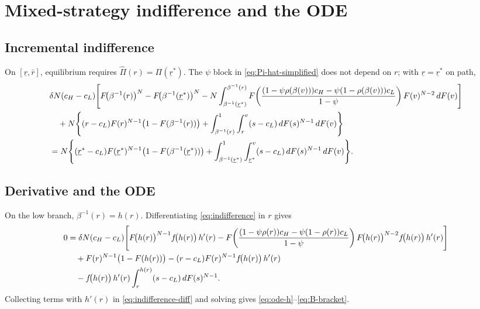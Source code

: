 \section{Mixed-strategy indifference and the ODE}
\label{app:mixed-eqm}

\subsection{Incremental indifference}
\label{app:indifference}

On $[\underline{r},\bar{r}]$, equilibrium requires
$\hat{\Pi}(r)=\Pi(\underline{r}^{*})$.
The $\psi$ block in \eqref{eq:Pi-hat-simplified} does not depend on $r$; with
$\underline{r}=\underline{r}^{*}$ on path,
\begin{align}
  &\delta N (c_H - c_L)
    \Biggl[
      F\!\bigl(\beta^{-1}(r)\bigr)^{N}
      - F\!\bigl(\beta^{-1}(\underline{r}^{*})\bigr)^{N}
      - N \int_{\beta^{-1}(\underline{r}^{*})}^{\beta^{-1}(r)}
        F\!\left(
          \frac{
            (1 - \psi \rho(\beta(v))) c_H
            - \psi(1 - \rho(\beta(v))) c_L
          }{1 - \psi}
        \right)
        F(v)^{N-2}\, dF(v)
    \Biggr]
  \notag\\
  &\quad + N \Biggl\{
    (r - c_L) F(r)^{N-1} \bigl(1 - F(\beta^{-1}(r))\bigr)
    + \int_{\beta^{-1}(r)}^{1}
      \int_{r}^{v} (s - c_L)\, dF(s)^{N-1}
      \, dF(v)
  \Biggr\}
  \notag\\
  &= N \Biggl\{
    (\underline{r}^{*} - c_L) F(\underline{r}^{*})^{N-1}
      \bigl(1 - F(\beta^{-1}(\underline{r}^{*}))\bigr)
    + \int_{\beta^{-1}(\underline{r}^{*})}^{1}
      \int_{\underline{r}^{*}}^{v} (s - c_L)\, dF(s)^{N-1}
      \, dF(v)
  \Biggr\}.
  \label{eq:indifference}
\end{align}

\subsection{Derivative and the ODE}
\label{app:indifference-diff}

On the low branch, $\beta^{-1}(r)=h(r)$. Differentiating
\eqref{eq:indifference} in $r$ gives
\begin{align}
  0
  &= \delta N (c_H - c_L)
    \Biggl[
      F\!\bigl(h(r)\bigr)^{N-1}
        f\!\bigl(h(r)\bigr)\,h'(r)
      - F\!\left(
          \frac{
            (1 - \psi \rho(r)) c_H
            - \psi(1 - \rho(r)) c_L
          }{1 - \psi}
        \right)
        F\!\bigl(h(r)\bigr)^{N-2}
        f\!\bigl(h(r)\bigr)\,h'(r)
    \Biggr]
  \notag\\
  &\quad + F(r)^{N-1} \bigl(1 - F(h(r))\bigr)
  - (r - c_L) F(r)^{N-1}
    f\!\bigl(h(r)\bigr)\,h'(r)
  \notag\\
  &\quad - f\!\bigl(h(r)\bigr)\,h'(r)
    \int_{r}^{h(r)} (s - c_L)\, dF(s)^{N-1}.
  \label{eq:indifference-diff}
\end{align}
Collecting terms with $h'(r)$ in \eqref{eq:indifference-diff} and solving gives
\eqref{eq:ode-h}--\eqref{eq:B-bracket}.

